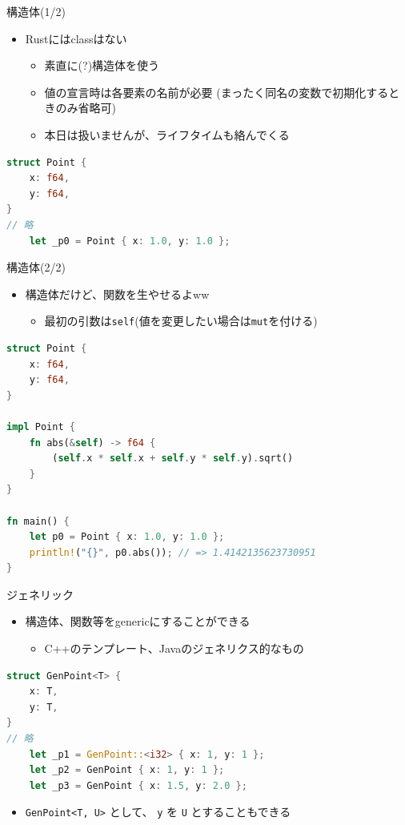 \documentclass[cjk,dvipdfmx,10pt,compress,fragile%
hyperref={bookmarks=true,bookmarksnumbered=true,bookmarksopen=false,%
colorlinks=false,%
pdftitle={第 134 回 関西 Debian 勉強会},%
pdfauthor={小林},%
pdfsubject={資料},%
}]{beamer}
\begin{document}
\begin{frame}[t,fragile]{構造体(1/2)}
\begin{itemize}
 \item Rustにはclassはない
       \begin{itemize}
	\item 素直に(?)構造体を使う
	\item 値の宣言時は各要素の名前が必要 (まったく同名の変数で初期化するときのみ省略可)
	\item 本日は扱いませんが、ライフタイムも絡んでくる
       \end{itemize}
\end{itemize}
\begin{lstlisting}[language=Rust,style=boxed,style=colouredRust,basicstyle=\small\tt,lineskip=-2pt]
struct Point {
    x: f64,
    y: f64,
}
// 略
    let _p0 = Point { x: 1.0, y: 1.0 };
\end{lstlisting}
\end{frame}

\begin{frame}[t,fragile]{構造体(2/2)}
\begin{itemize}
 \item 構造体だけど、関数を生やせるよww
       \begin{itemize}
	\item 最初の引数は\texttt{self}(値を変更したい場合は\texttt{mut}を付ける)
       \end{itemize}
\end{itemize}
\begin{lstlisting}[language=Rust,style=boxed,style=colouredRust,basicstyle=\small\tt,lineskip=-2pt]
struct Point {
    x: f64,
    y: f64,
}

impl Point {
    fn abs(&self) -> f64 {
        (self.x * self.x + self.y * self.y).sqrt()
    }
}

fn main() {
    let p0 = Point { x: 1.0, y: 1.0 };
    println!("{}", p0.abs()); // => 1.4142135623730951
}\end{lstlisting}
\end{frame}

\begin{frame}[t,fragile]{ジェネリック}
\begin{itemize}
 \item 構造体、関数等をgenericにすることができる
       \begin{itemize}
	\item C++のテンプレート、Javaのジェネリクス的なもの
       \end{itemize}
\end{itemize}
\begin{lstlisting}[language=Rust,style=boxed,style=colouredRust,basicstyle=\small\tt,lineskip=-2pt]
struct GenPoint<T> {
    x: T,
    y: T,
}
// 略
    let _p1 = GenPoint::<i32> { x: 1, y: 1 };
    let _p2 = GenPoint { x: 1, y: 1 };
    let _p3 = GenPoint { x: 1.5, y: 2.0 };
\end{lstlisting}
\begin{itemize}
 \item \verb|GenPoint<T, U>| として、 \texttt{y} を \texttt{U} とすることもできる
\end{itemize}
\end{frame}
\end{document}
